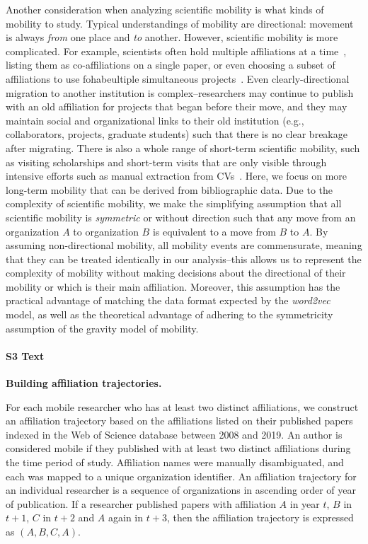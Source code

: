 \documentclass[12pt]{article} %
\begin{document}
Another consideration when analyzing scientific mobility is what kinds of mobility to study.
Typical understandings of mobility are directional: movement is always \textit{from} one place and \textit{to} another.
However, scientific mobility is more complicated.
For example, scientists often hold multiple affiliations at a time~\autocite{markova2016synchronous}, listing them as co-affiliations on a single paper, or even choosing a subset of affiliations to use fohabeultiple simultaneous projects~\autocite{robinson2019mobility}.
Even clearly-directional migration to another institution is complex--researchers may continue to publish with an old affiliation for projects that began before their move, and they may maintain social and organizational links to their old institution (e.g., collaborators, projects, graduate students) such that there is no clear breakage after migrating.
There is also a whole range of short-term scientific mobility, such as visiting scholarships and short-term visits that are only visible through intensive efforts such as manual extraction from CVs~\autocite{woolley2009cv, sandstrom2009cv, canibano2011temporary}.
Here, we focus on more long-term mobility that can be derived from bibliographic data.
Due to the complexity of scientific mobility, we make the simplifying assumption that all scientific mobility is \textit{symmetric} or without direction such that any move from an organization $A$ to organization $B$ is equivalent to a move from $B$ to $A$.
By assuming non-directional mobility, all mobility events are commensurate, meaning that they can be treated identically in our analysis--this allows us to represent the complexity of mobility without making decisions about the directional of their mobility or which is their main affiliation.
Moreover, this assumption has the practical advantage of matching the data format expected by the \textit{word2vec} model, as well as the theoretical advantage of adhering to the symmetricity assumption of the gravity model of mobility.



%
\paragraph*{S3 Text}
\label{si:text:mobility_traj}
{\bf Building affiliation trajectories.}

For each mobile researcher who has at least two distinct affiliations, we construct an affiliation trajectory based on the affiliations listed on their published papers indexed in the Web of Science database between 2008 and 2019.
An author is considered mobile if they published with at least two distinct affiliations during the time period of study.
Affiliation names were manually disambiguated, and each was mapped to a unique organization identifier.
An affiliation trajectory for an individual researcher is a sequence of organizations in ascending order of year of publication.
If a researcher published papers with affiliation $A$ in year $t$, $B$ in $t+1$, $C$ in $t+2$ and $A$ again in $t+3$, then the affiliation trajectory is expressed as $(A, B, C, A)$.
\end{document}
